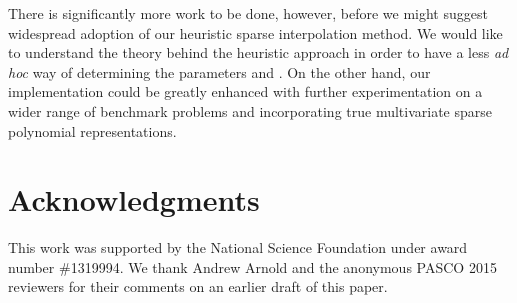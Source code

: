 \documentclass[letterpaper,10pt]{article}
\begin{document}
There is significantly more work to be done, however, before we might
suggest widespread adoption of our heuristic sparse interpolation
method. We would like to understand the theory behind the heuristic
approach in order to have a less \emph{ad hoc} way of determining the
parameters  and . On the other hand, our implementation could
be greatly enhanced with further experimentation on a wider range of
benchmark problems and incorporating true multivariate sparse polynomial
representations.



\section*{Acknowledgments}
This work was supported by the National Science Foundation under
award number \#1319994. We thank Andrew Arnold and the anonymous PASCO
2015 reviewers for their comments on an earlier draft of this paper.

\renewcommand{\bibpreamble}{\addcontentsline{toc}{section}{References}}

\end{document}
